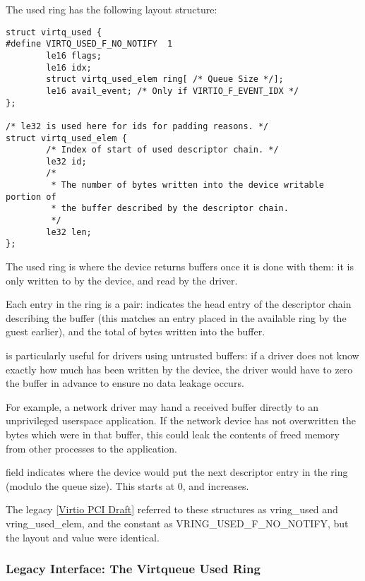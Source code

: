 The used ring has the following layout structure:

\begin{lstlisting}
struct virtq_used {
#define VIRTQ_USED_F_NO_NOTIFY  1
        le16 flags;
        le16 idx;
        struct virtq_used_elem ring[ /* Queue Size */];
        le16 avail_event; /* Only if VIRTIO_F_EVENT_IDX */
};

/* le32 is used here for ids for padding reasons. */
struct virtq_used_elem {
        /* Index of start of used descriptor chain. */
        le32 id;
        /*
         * The number of bytes written into the device writable portion of
         * the buffer described by the descriptor chain.
         */
        le32 len;
};
\end{lstlisting}

The used ring is where the device returns buffers once it is done with
them: it is only written to by the device, and read by the driver.

Each entry in the ring is a pair:  indicates the head entry of the
descriptor chain describing the buffer (this matches an entry
placed in the available ring by the guest earlier), and  the total
of bytes written into the buffer.

\begin{note}
 is particularly useful
for drivers using untrusted buffers: if a driver does not know exactly
how much has been written by the device, the driver would have to zero
the buffer in advance to ensure no data leakage occurs.

For example, a network driver may hand a received buffer directly to
an unprivileged userspace application.  If the network device has not
overwritten the bytes which were in that buffer, this could leak the
contents of freed memory from other processes to the application.
\end{note}

 field indicates where the device would put the next descriptor
entry in the ring (modulo the queue size). This starts at 0, and increases.

\begin{note}
The legacy \hyperref[intro:Virtio PCI Draft]{[Virtio PCI Draft]}
referred to these structures as vring_used and vring_used_elem, and
the constant as VRING_USED_F_NO_NOTIFY, but the layout and value were
identical.
\end{note}

\subsubsection{Legacy Interface: The Virtqueue Used
Ring}\label{sec:Basic Facilities of a Virtio Device / Virtqueues
/ The Virtqueue Used Ring/ Legacy Interface: The Virtqueue Used
Ring}

